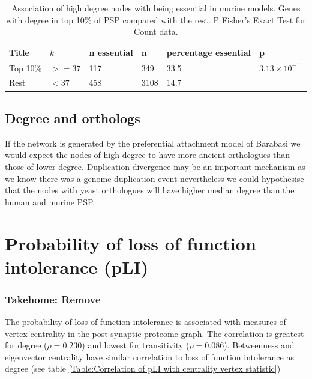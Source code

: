  \begin{table}[h]
     \centering
     \begin{tabular}{llllll}
          Title & $k$& n essential & n & percentage essential & p   \\
          \hline
          Top 10\% & $>=37$ & 117 & 349 & 33.5 & $3.13 \times 10^{-11}$\\
          Rest & $<37$ & 458 & 3108 & 14.7 & \\
     \end{tabular}
     \caption{Association of high degree nodes with being essential in murine models. Genes with degree in top 10\% of PSP compared with the rest. P Fisher's Exact Test for Count data.}
     \label{Table:Degree and murine essentialness PSP}
 \end{table}
 





\subsection{Degree and orthologs}

If the network is generated by the preferential attachment model of Barabasi we would expect the nodes of high degree to have more ancient orthologues than those of lower degree.  Duplication divergence  may be an important mechanism as we know there was a genome duplication event nevertheless we could hypothesise that the nodes with yeast orthologues will have higher median degree than the human and murine PSP. 

\section{Probability of loss of function intolerance (pLI)}

 \subsubsection{Takehome: Remove}

The probability of loss of function intolerance is associated with measures of vertex centrality in the post synaptic proteome graph. The correlation is greatest for degree ($\rho=0.230$) and lowest for transitivity ($\rho=0.086$). Betweenness and eigenvector centrality have similar correlation to loss of function intolerance as degree (see table \ref{Table:Correlation of pLI with centrality vertex statistic})



